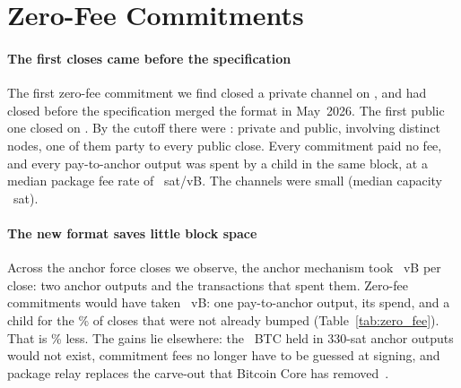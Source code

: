 \section{Zero-Fee Commitments}
\label{sec:zerofee}

{\setlength{\tabcolsep}{3pt}}

\paragraph{The first closes came before the specification}
The first zero-fee commitment we find closed a private channel on \ZfFirst, and \ZfBeforeMerge{} had closed before the
specification merged the format in May~2026. The first public one closed on \ZfFirstPublic. By the cutoff there were
\ZfCloses{}: \ZfUnlisted{} private and \ZfPublic{} public, involving \ZfPublicNodes{} distinct nodes, one of them party to
every public close. Every commitment paid no fee, and every pay-to-anchor output was spent by a child in the same
block, at a median package fee rate of \ZfPkgFr~sat/vB. The channels were small (median capacity \ZfMedCap~sat).

\paragraph{The new format saves little block space}
Across the \CfCloses{} anchor force closes we observe, the anchor mechanism took \CfAnchorVb~vB per close: two anchor
outputs and the transactions that spent them. Zero-fee commitments would have taken \CfPtwoaVb~vB: one pay-to-anchor
output, its spend, and a child for the \CfNotBumpedPct\% of closes that were not already bumped
(Table~\ref{tab:zero_fee}). That is \CfSavingPct\% less. The gains lie
elsewhere: the \CfAnchorBtc~BTC held in 330-sat anchor outputs would not exist, commitment fees no longer have to be
guessed at signing, and package relay replaces the carve-out that Bitcoin Core has
removed~\cite{core28,core31}.
